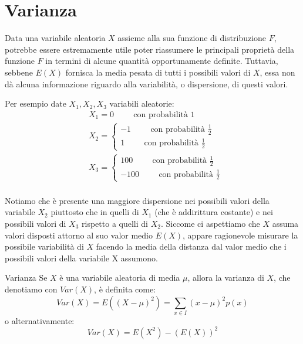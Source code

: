 \section{Varianza}
Data una variabile aleatoria $X$ assieme alla sua funzione di distribuzione $F$, potrebbe essere estremamente utile poter riassumere le principali proprietà della funzione $F$ in termini di alcune quantità opportunamente definite. Tuttavia, sebbene $E(X)$ fornisca la media pesata di tutti i possibili valori di $X$, essa non dà alcuna informazione riguardo alla variabilità, o dispersione, di questi valori.

Per esempio date $X_1, X_2, X_3$ variabili aleatorie:
\begin{align*}
    &X_1=0\hspace{1cm}\mbox{con probabilità }1\\
    &X_2=\begin{cases}-1\hspace{1cm}\mbox{con probabilità }\frac{1}{2}\\1\hspace{1cm}\mbox{con probabilità }\frac{1}{2}\end{cases}\\
    &X_3=\begin{cases}100\hspace{1cm}\mbox{con probabilità }\frac{1}{2}\\-100\hspace{1cm}\mbox{con probabilità }\frac{1}{2}\end{cases}\\
\end{align*}

Notiamo che è presente una maggiore dispersione nei possibili valori della variabile $X_2$ piuttosto che in quelli di $X_1$ (che è addirittura costante) e nei possibili valori di $X_3$ rispetto a quelli di $X_2$. Siccome ci aspettiamo che $X$ assuma valori disposti attorno al suo valor medio $E(X)$, appare ragionevole misurare la possibile variabilità di $X$ facendo la media della distanza dal valor medio che i possibili valori della variabile X assumono.

\begin{Definition}{Varianza}{}
    Se $X$ è una variabile aleatoria di media $\mu$, allora la varianza di $X$, che denotiamo con $Var(X)$, è definita come:
    \begin{equation*}
        Var(X)=E((X-\mu)^2)=\sum_{x\in I}(x-\mu)^2p(x)
    \end{equation*}
    o alternativamente:
    \begin{equation*}
        Var(X)=E(X^2)-(E(X))^2
    \end{equation*}
\end{Definition}

